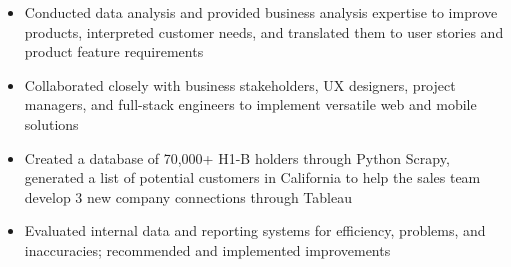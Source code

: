 \documentclass{resume}
\begin{document}
\begin{itemize}
      \item Conducted data analysis and provided business analysis expertise to
            improve products, interpreted customer needs, and translated them
            to
            user
            stories and product feature requirements
      \item Collaborated closely with business stakeholders, UX designers,
            project managers, and full-stack engineers to implement versatile
            web
            and
            mobile solutions
      \item Created a database of 70,000+ H1-B holders through Python Scrapy,
            generated a list of potential customers in California to help the
            sales
            team
            develop 3 new company connections through Tableau
      \item Evaluated internal data and reporting systems for efficiency,
            problems, and inaccuracies; recommended and implemented
            improvements
\end{itemize}



%
%
\end{document}

